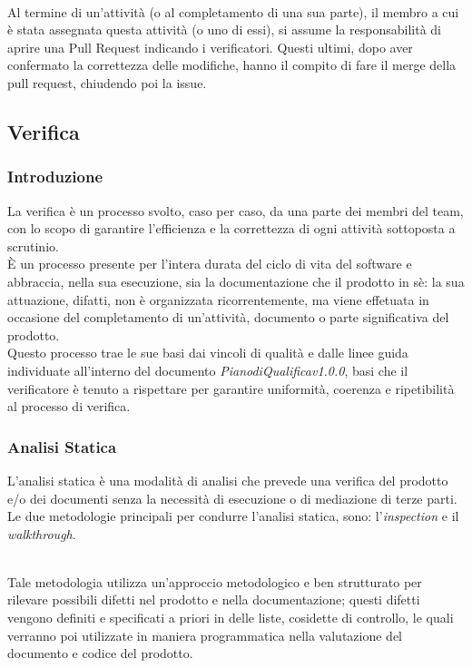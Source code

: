  \\
Al termine di un'attività (o al completamento di una sua parte), il membro a cui è stata assegnata questa attività (o uno di essi), si assume la responsabilità di aprire una Pull Request indicando i verificatori. Questi ultimi, dopo aver confermato la correttezza delle modifiche, hanno il compito di fare il merge della pull request, chiudendo poi la issue.

\subsection{Verifica}

\subsubsection{Introduzione}

La verifica è un processo svolto, caso per caso, da una parte dei membri del team, con lo scopo di garantire l'efficienza e la correttezza di ogni attività sottoposta a scrutinio. \\
È un processo presente per l'intera durata del ciclo di vita del software e abbraccia, nella sua esecuzione, sia la documentazione che il prodotto in sè: la sua attuazione, difatti, non è organizzata ricorrentemente, ma viene effetuata in occasione del completamento di un'attività, documento o parte significativa del prodotto. \\
Questo processo trae le sue basi dai vincoli di qualità e dalle linee guida individuate all'interno del documento \textit{Piano\textunderscore di\textunderscore Qualifica\textunderscore v1.0.0}, basi che il verificatore è tenuto a rispettare per garantire uniformità, coerenza e ripetibilità al processo di verifica.

\subsubsection{Analisi Statica}

L'analisi statica è una modalità di analisi che prevede una verifica del prodotto e/o dei documenti senza la necessità di esecuzione o di mediazione di terze parti. \\
Le due metodologie principali per condurre l'analisi statica, sono: l'\textit{inspection} e il \textit{walkthrough}.

 \\
Tale metodologia utilizza un'approccio metodologico e ben strutturato per rilevare possibili difetti nel prodotto e nella documentazione; questi difetti vengono definiti e specificati a priori in delle liste, cosidette di controllo, le quali verranno poi utilizzate in maniera programmatica nella valutazione del documento e codice del prodotto.

